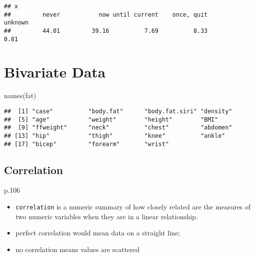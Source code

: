 \documentclass[
]{book}
\newenvironment{Shaded}{\begin{snugshade}}{\end{snugshade}}
\newcommand{\FunctionTok}[1]{\textcolor[rgb]{0.00,0.00,0.00}{#1}}
\newcommand{\NormalTok}[1]{#1}
\newcommand{\SpecialCharTok}[1]{\textcolor[rgb]{0.00,0.00,0.00}{#1}}
\providecommand{\tightlist}{%
  \setlength{\itemsep}{0pt}\setlength{\parskip}{0pt}}
\theoremstyle{definition}
\theoremstyle{definition}
\theoremstyle{definition}
\theoremstyle{definition}
\theoremstyle{remark}
\begin{document}
\begin{verbatim}
## x
##         never           now until current    once, quit       unknown 
##         44.01         39.16          7.69          8.33          0.81
\end{verbatim}

\hypertarget{bivariate-data}{%
\chapter{Bivariate Data}\label{bivariate-data}}

\begin{Shaded}
\begin{Highlighting}[]
\FunctionTok{names}\NormalTok{(fat)}
\end{Highlighting}
\end{Shaded}

\begin{verbatim}
##  [1] "case"          "body.fat"      "body.fat.siri" "density"      
##  [5] "age"           "weight"        "height"        "BMI"          
##  [9] "ffweight"      "neck"          "chest"         "abdomen"      
## [13] "hip"           "thigh"         "knee"          "ankle"        
## [17] "bicep"         "forearm"       "wrist"
\end{verbatim}

\hypertarget{correlation}{%
\section{Correlation}\label{correlation}}

p.106

\begin{itemize}
\tightlist
\item
  \texttt{correlation} is a numeric summary of how closely related are the measures of two numeric variables when they are in a linear relationship.
\item
  perfect correlation would mean data on a straight line;
\item
  no correlation means values are scattered
\end{itemize}

\begin{Shaded}
\end{Shaded}
\end{document}
